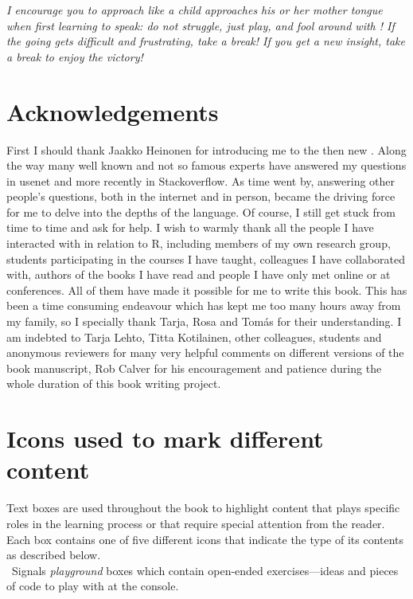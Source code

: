 \emph{I encourage you to approach \Rlang like a child approaches his or her mother tongue when first learning to speak: do not struggle, just play, and fool around with \Rlang! If the going gets difficult and frustrating, take a break! If you get a new insight, take a break to enjoy the victory!
}%

\section*{Acknowledgements}
First I should thank Jaakko Heinonen for introducing me to the then new \Rlang. Along the way many well known and not so famous experts have answered my questions in usenet and more recently in Stackoverflow. As time went by, answering other people's questions, both in the internet and in person, became the driving force for me to delve into the depths of the \Rlang language. Of course, I still get stuck from time to time and ask for help. I wish to warmly thank all the people I have interacted with in relation to R, including members of my own research group, students participating in the courses I have taught, colleagues I have collaborated with, authors of the books I have read and people I have only met online or at conferences. All of them have made it possible for me to write this book. This has been a time consuming endeavour which has kept me too many hours away from my family, so I specially thank Tarja, Rosa and Tomás for their understanding. I am indebted to Tarja Lehto, Titta Kotilainen, other colleagues, students and anonymous reviewers for many very helpful comments on different versions of the book manuscript, Rob Calver for his encouragement and patience during the whole duration of this book writing project.

\section*{Icons used to mark different content}

Text boxes are used throughout the book to highlight content that plays specific roles in the learning process or that require special attention from the reader. Each box contains one of five different icons that indicate the type of its contents as described below.\\[1.5ex]

\noindent
\playicon\ Signals \emph{playground} boxes which contain open-ended exercises---ideas and pieces of \Rlang code to play with at the \Rlang console.\\[1.5ex]

